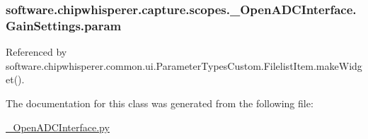 \subsubsection[{param}]{\setlength{\rightskip}{0pt plus 5cm}software.\+chipwhisperer.\+capture.\+scopes.\+\_\+\+Open\+A\+D\+C\+Interface.\+Gain\+Settings.\+param}\label{classsoftware_1_1chipwhisperer_1_1capture_1_1scopes_1_1__OpenADCInterface_1_1GainSettings_ab2fbbbb1845ef81b590848f5580a1e19}


Referenced by software.\+chipwhisperer.\+common.\+ui.\+Parameter\+Types\+Custom.\+Filelist\+Item.\+make\+Widget().



The documentation for this class was generated from the following file\+:\begin{DoxyCompactItemize}
\item 
\hyperlink{__OpenADCInterface_8py}{\+\_\+\+Open\+A\+D\+C\+Interface.\+py}\end{DoxyCompactItemize}
